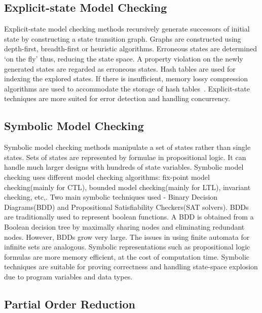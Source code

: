 \subsection{Explicit-state Model Checking}

Explicit-state model checking methods recursively generate successors of initial state by constructing a state transition graph. 
Graphs are constructed using depth-first, breadth-first or heuristic algorithms. 
Erroneous states are determined `on the fly' thus, reducing the state space. 
A property violation on the newly generated states are regarded as erroneous states. 
Hash tables are used for indexing the explored states. 
If there is insufficient, memory lossy compression algorithms are used to accommodate the storage of hash tables~\citep{d2008survey}. 
Explicit-state techniques are more suited for error detection and handling concurrency. 

\subsection{Symbolic Model Checking}

Symbolic model checking methods manipulate a set of states rather than single states. 
Sets of states are represented by formulae in propositional logic. 
It can handle much larger designs with hundreds of state variables. 
Symbolic model checking uses different model checking algorithms: fix-point model checking(mainly for CTL), bounded model checking(mainly for LTL), invariant checking, etc,. 
Two main symbolic techniques used - Binary Decision Diagrams(BDD) and Propositional Satisfiability Checkers(SAT solvers). 
BDDs are traditionally used to represent boolean functions. 
A BDD is obtained from a Boolean decision tree by maximally sharing nodes and eliminating redundant nodes. 
However, BDDs grow very large. 
The issues in using finite automata for infinite sets are analogous. 
Symbolic representations such as propositional logic formulas are more memory efficient, at the cost of computation time. 
Symbolic techniques are suitable for proving correctness and handling state-space explosion due to program variables and data types.


\subsection{Partial Order Reduction}

